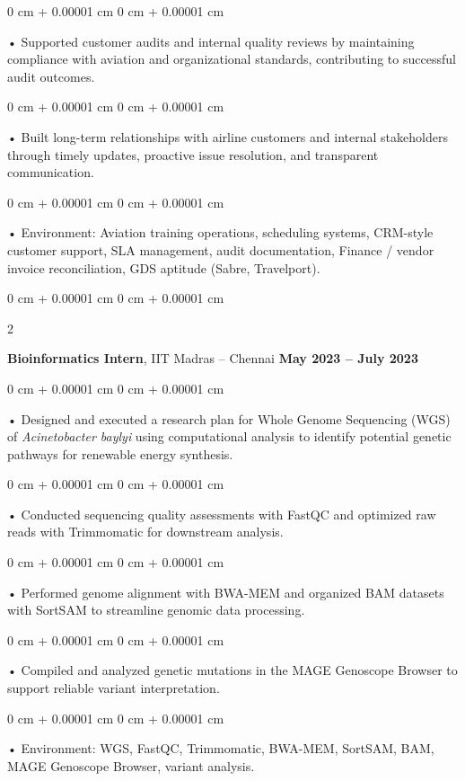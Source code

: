\documentclass[10pt, letterpaper]{article}
\newenvironment{onecolentry}{
    \begin{adjustwidth}{
        0 cm + 0.00001 cm
    }{
        0 cm + 0.00001 cm
    }
}{
    \end{adjustwidth}
} %
\newenvironment{twocolentry}[2][]{
    \onecolentry
    \def\secondColumn{#2}
    \setcolumnwidth{\fill, 4.5 cm}
    \begin{paracol}{2}
}{
    \switchcolumn \raggedleft \secondColumn
    \end{paracol}
    \endonecolentry
} %
\begin{document}
        \begin{onecolentry}
             • Supported customer audits and internal quality reviews by maintaining compliance with aviation and organizational standards, contributing to successful audit outcomes.
        \end{onecolentry}
        \begin{onecolentry}
             • Built long-term relationships with airline customers and internal stakeholders through timely updates, proactive issue resolution, and transparent communication.
        \end{onecolentry}
        \begin{onecolentry}
             • Environment: Aviation training operations, scheduling systems, CRM-style customer support, SLA management, audit documentation, Finance / vendor invoice reconciliation, GDS aptitude (Sabre, Travelport).
        \end{onecolentry}

        \vspace{0.1cm}

        \begin{twocolentry}{
            \textbf{May 2023 -- July 2023}
        }
            \textbf{Bioinformatics Intern}, IIT Madras -- Chennai\end{twocolentry}

        \begin{onecolentry}
             • Designed and executed a research plan for Whole Genome Sequencing (WGS) of \textit{Acinetobacter baylyi} using computational analysis to identify potential genetic pathways for renewable energy synthesis.
        \end{onecolentry}
        \begin{onecolentry}
             • Conducted sequencing quality assessments with FastQC and optimized raw reads with Trimmomatic for downstream analysis.
        \end{onecolentry}
        \begin{onecolentry}
             • Performed genome alignment with BWA-MEM and organized BAM datasets with SortSAM to streamline genomic data processing.
        \end{onecolentry}
        \begin{onecolentry}
             • Compiled and analyzed genetic mutations in the MAGE Genoscope Browser to support reliable variant interpretation.
        \end{onecolentry}
        \begin{onecolentry}
             • Environment: WGS, FastQC, Trimmomatic, BWA-MEM, SortSAM, BAM, MAGE Genoscope Browser, variant analysis.
        \end{onecolentry}
\end{document}
